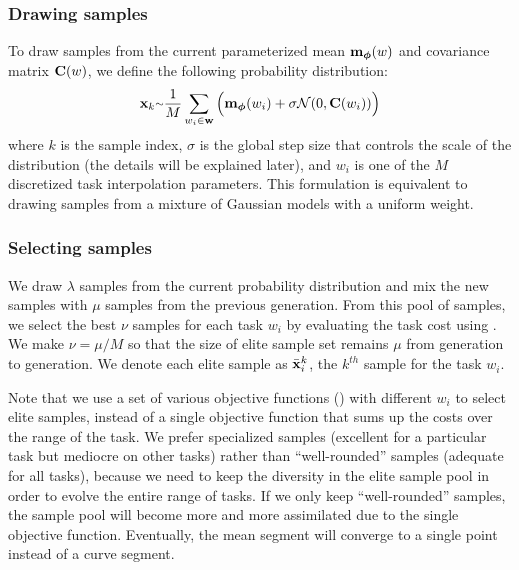 

\subsubsection{Drawing samples}

To draw samples from the current parameterized mean
$\mathbf{m}_{\boldsymbol{\phi}}(w)$ and covariance matrix $\mathbf{C}(w)$, we
define the following probability distribution:
\begin{equation}
  \begin{aligned}
    \vc{x}_k \mytilde \frac{1}{M} \sum_{w_i \in \vc{w}}
      \Big(
      \vc{m}_{\boldsymbol{\phi}}(w_i) + \sigma \mathcal{N}(
      0, \vc{C}(w_i) ) \Big)
  \end{aligned}
  \label{eq:optskills_drawing_samples}
\end{equation} 
where $k$ is the sample index, $\sigma$ is the global step size that
controls the scale of the distribution (the details will be explained
later), and $w_i$ is one of the $M$ discretized task interpolation
parameters. This formulation is equivalent to drawing samples from a
mixture of Gaussian models with a uniform weight.

\subsubsection{Selecting samples}
We draw $\lambda$ samples from the current probability distribution
and mix the new samples with $\mu$ samples from the previous generation. From this
pool of samples, we select the best $\nu$ samples for each task $w_i$
by evaluating the task cost using . We make $\nu =
\mu / M$ so that the size of elite sample set remains $\mu$ from
generation to generation. We denote each elite sample as
$\bar{\mathbf{x}}_i^k$, the $k^{th}$ sample for the task $w_i$.

Note that we use a set of various objective functions
() with different $w_i$ to select elite samples,
instead of a single objective function that sums up the costs over the
range of the task. We prefer specialized samples (excellent for
a particular task but mediocre on other tasks) rather than
``well-rounded'' samples (adequate for all tasks), because we need to
keep the diversity in the elite sample pool in order to evolve the
entire range of tasks. If we only keep ``well-rounded'' samples, the
sample pool will become more and more assimilated due to the single
objective function. Eventually, the mean segment will converge to a
single point instead of a curve segment.

